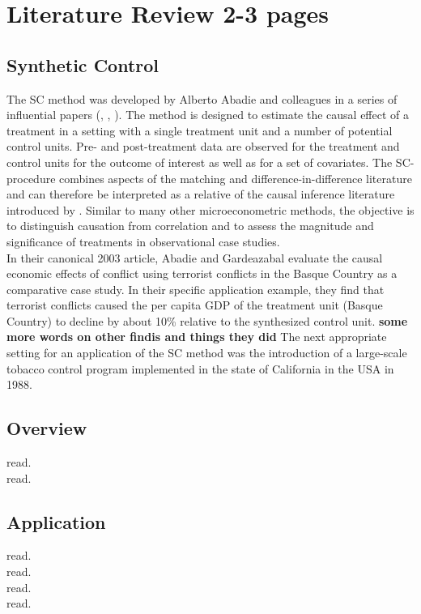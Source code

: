 \section{Literature Review 2-3 pages}

\subsection{Synthetic Control}
The \ac{SC} method was developed by Alberto Abadie and colleagues in a series of influential papers (\cite{abadie:2003}, \cite{abadie:2007}, \cite{abadie:2015}). The method is designed to estimate the causal effect of a treatment in a setting with a single treatment unit and a number of potential control units. Pre- and post-treatment data are observed for the treatment and control units for the outcome of interest as well as for a set of covariates. The \ac{SC}-procedure combines aspects of the matching and difference-in-difference literature and can therefore be interpreted as a relative of the causal inference literature introduced by \cite{rubin:1974}. Similar to many other microeconometric methods, the objective is to distinguish causation from correlation and to assess the magnitude and significance of treatments in observational case studies.
\\
In their canonical 2003 article, Abadie and Gardeazabal evaluate the causal economic effects of conflict using terrorist conflicts in the Basque Country as a comparative case study.  In their specific application example, they find that terrorist conflicts caused the per capita \ac{GDP} of the treatment unit (Basque Country) to decline by about 10\% relative to the synthesized control unit. \textbf{some more words on other findis and things they did}
The next appropriate setting for an application of the \ac{SC} method was the introduction of a large-scale tobacco control program implemented in the state of California in the \ac{USA} in 1988. 

 


\subsection{Overview}
\cite{abadie:2021a} read.\\
\cite{athey:2016} read.

\subsection{Application}
\cite{born:2019} read. \\
\cite{cho:2020} read.\\
\cite{cunningham:2021} read.\\
\cite{funke:2020} read.

